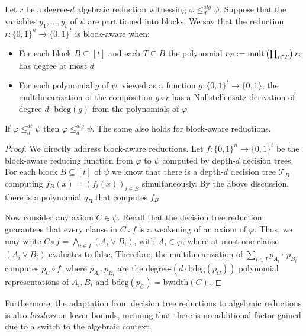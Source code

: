\begin{definition}
    Let $r$ be a degree-$d$ algebraic reduction witnessing $\varphi \leq_d^{alg} \psi$. Suppose that the variables $y_1, \ldots, y_t$ of $\psi$ are partitioned into blocks. We say that the reduction $r : \{0,1\}^n \to \{0,1\}^t$ is block-aware when:
    \begin{itemize}
        \item For each block $B \subseteq [t]$ and each $T \subseteq B$ the polynomial $r_T := \mathrm{mult}\left ( \prod_{i \in T} \right ) r_i$ has degree at most $d$
        \item For each polynomial $g$ of $\psi$, viewed as a function $g : \{0,1\}^t \to \{0,1\}$, the multilinearization of the composition $g \circ r$ has a Nullstellensatz derivation of degree $d \cdot \mathrm{bdeg}(g)$ from the polynomials of $\varphi$
    \end{itemize}
\end{definition}

\begin{proposition}
    If $\varphi \leq_d^{dt} \psi$ then $\varphi \leq_d^{alg} \psi$. The same also holds for block-aware reductions.
\end{proposition}

\begin{proof}
    We directly address block-aware reductions. Let $f : \{0,1\}^n \to \{0,1\}^t$ be the block-aware reducing function from $\varphi$ to $\psi$ computed by depth-$d$ decision trees. For each block $B \subseteq [t]$ of $\psi$ we know that there is a depth-$d$ decision tree $\mathcal{T}_B$ computing $f_B(x) = (f_i(x))_{i \in B}$ simultaneously. By the above discussion, there is a polynomial $q_B$ that computes $f_B$.

    Now consider any axiom $C \in \psi$. Recall that the decision tree reduction guarantees that every clause in $C \circ f$ is a weakening of an axiom of $\varphi$. Thus, we may write $C \circ f = \bigwedge_{i \in I} (A_i \lor B_i)$, with $A_i \in \varphi$, where at most one clause $(A_i \lor B_i)$ evaluates to false. Therefore, the multilinearization of $\sum_{i \in I} p_{A_i} \cdot\, p_{B_i}$ computes $p_C \circ f$, where $p_{A_i}, p_{B_i}$ are the degree-$(d \cdot \mathrm{bdeg}(p_{C}))$ polynomial representations of $A_i, B_i$ and $\mathrm{bdeg}(p_C) = \mathrm{bwidth}(C)$.
\end{proof}

Furthermore, the adaptation from decision tree reductions to algebraic reductions is also \textit{lossless} on lower bounds, meaning that there is no additional factor gained due to a switch to the algebraic context.

